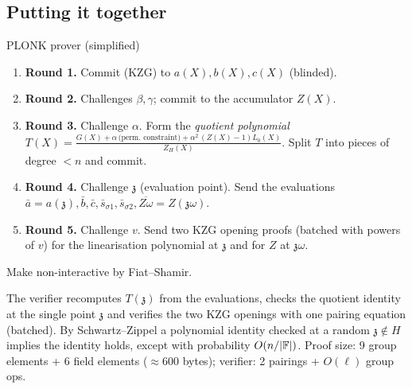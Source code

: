 \documentclass[11pt,a4paper]{report}
\theoremstyle{plain}
\theoremstyle{definition}
\theoremstyle{remark}
\begin{document}
\subsection{Putting it together}
\begin{algorithm}[label=pr:plonk]{PLONK prover (simplified)}
\begin{enumerate}
\item \textbf{Round 1.} Commit (KZG) to $a(X),b(X),c(X)$ (blinded).
\item \textbf{Round 2.} Challenges $\beta,\gamma$; commit to the accumulator $Z(X)$.
\item \textbf{Round 3.} Challenge $\alpha$. Form the \emph{quotient polynomial} $T(X)=\frac{G(X)+\alpha\,\text{(perm. constraint)}+\alpha^2\,(Z(X)-1)L_0(X)}{Z_H(X)}$. Split $T$ into pieces of degree $<n$ and commit.
\item \textbf{Round 4.} Challenge $\mathfrak z$ (evaluation point). Send the evaluations $\bar a=a(\mathfrak z),\bar b,\bar c,\bar s_{\sigma1},\bar s_{\sigma2},\overline{Z\omega}=Z(\mathfrak z\omega)$.
\item \textbf{Round 5.} Challenge $v$. Send two KZG opening proofs (batched with powers of $v$) for the linearisation polynomial at $\mathfrak z$ and for $Z$ at $\mathfrak z\omega$.
\end{enumerate}
Make non-interactive by Fiat--Shamir.
\end{algorithm}
The verifier recomputes $T(\mathfrak z)$ from the evaluations, checks the quotient identity at the single point $\mathfrak z$ and verifies the two KZG openings with one pairing equation (batched). By Schwartz--Zippel a polynomial identity checked at a random $\mathfrak z\notin H$ implies the identity holds, except with probability $O(n/|\mathbb{F}|)$. Proof size: 9 group elements + 6 field elements ($\approx600$ bytes); verifier: 2 pairings + $O(\ell)$ group ops.
\begin{center}
\end{center}
\end{document}
